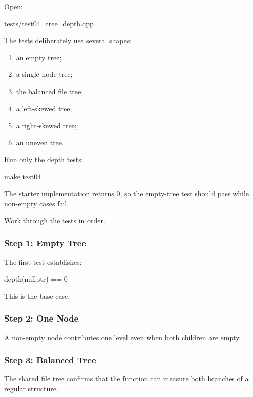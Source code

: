 \documentclass{csc2059practical}
\begin{document}
Open:

\begin{terminal}
tests/test04_tree_depth.cpp
\end{terminal}

The tests deliberately use several shapes:

\begin{enumerate}
    \item an empty tree;
    \item a single-node tree;
    \item the balanced file tree;
    \item a left-skewed tree;
    \item a right-skewed tree;
    \item an uneven tree.
\end{enumerate}

Run only the depth tests:

\begin{terminal}
make test04
\end{terminal}

The starter implementation returns \(0\), so the empty-tree test should pass
while non-empty cases fail.

Work through the tests in order.

\subsubsection*{Step 1: Empty Tree}

The first test establishes:

\begin{cppcode}
depth(nullptr) == 0
\end{cppcode}

This is the base case.

\subsubsection*{Step 2: One Node}

A non-empty node contributes one level even when both children are empty.

\subsubsection*{Step 3: Balanced Tree}

The shared file tree confirms that the function can measure both branches of a
regular structure.
\end{document}
